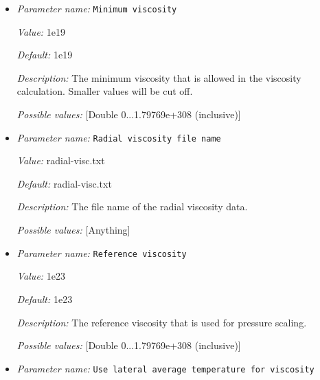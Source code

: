 \begin{itemize}
{\it Value:} 1e23


{\it Default:} 1e23


{\it Description:} The maximum viscosity that is allowed in the viscosity calculation. Larger values will be cut off.


{\it Possible values:} [Double 0...1.79769e+308 (inclusive)]
\item {\it Parameter name:} {\tt Minimum viscosity}
\label{parameters:Material model/Steinberger model/Minimum viscosity}


{\it Value:} 1e19


{\it Default:} 1e19


{\it Description:} The minimum viscosity that is allowed in the viscosity calculation. Smaller values will be cut off.


{\it Possible values:} [Double 0...1.79769e+308 (inclusive)]
\item {\it Parameter name:} {\tt Radial viscosity file name}
\label{parameters:Material model/Steinberger model/Radial viscosity file name}


{\it Value:} radial-visc.txt


{\it Default:} radial-visc.txt


{\it Description:} The file name of the radial viscosity data. 


{\it Possible values:} [Anything]
\item {\it Parameter name:} {\tt Reference viscosity}
\label{parameters:Material model/Steinberger model/Reference viscosity}


{\it Value:} 1e23


{\it Default:} 1e23


{\it Description:} The reference viscosity that is used for pressure scaling. 


{\it Possible values:} [Double 0...1.79769e+308 (inclusive)]
\item {\it Parameter name:} {\tt Use lateral average temperature for viscosity}
\label{parameters:Material model/Steinberger model/Use lateral average temperature for viscosity}



\end{itemize}
